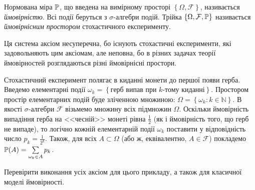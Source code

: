 \begin{definition}
    Нормована міра $\P$, що введена на вимірному просторі $\left\{ \Omega, \mathcal{F}\right\}$,
    називається \emph{ймовірністю}. Всі події беруться з $\sigma$-алгебри подій.
    Трійка $\left\{ \Omega, \mathcal{F}, \P\right\}$ називається 
    \emph{ймовірнісним простором} стохастичного експерименту.
\end{definition}

Ця система аксіом несуперечна, бо існують стохастичні експерименти,
які задовольняють цим аксіомам, але неповна, бо в різних задачах
теорії ймовірностей розглядаються різні ймовірнісні простори.

\begin{example}
    Стохастичний експеримент полягає в киданні монети до першої появи герба. Введемо елементарні події $\omega_k = \left\{ 
        \text{герб випав при } k \text{-тому киданні}
    \right\}$. Простором простір елементарних подій буде зліченною множиною:
    $\Omega = \left\{\omega_k : k \in \mathbb{N} \right\}$. В якості $\sigma$-алгебри $\mathcal{F}$ візьмемо множину всіх підмножин $\Omega$.
    Оскільки ймовірність випадіння герба на <<чесній>> монеті рівна $\frac{1}{2}$ (як і ймовірність того, що герб не випаде), то логічно кожній елементарній події $\omega_k$ поставити 
    у відповідність число $p_k = \frac{1}{2^k}$. Також, для всіх $A \subset \Omega$ (або ж, еквівалентно, $A \in \mathcal{F}$) покладемо
    $\P(A) = \sum\limits_{\omega_k \in A} p_k$.
\end{example}

\begin{exercise}
    Перевірити виконання усіх аксіом для цього прикладу, а також для класичної моделі ймовірності.
\end{exercise}

